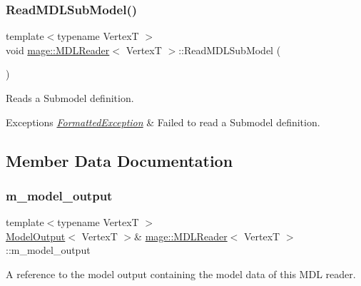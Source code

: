 \subsubsection{\texorpdfstring{Read\+M\+D\+L\+Sub\+Model()}{ReadMDLSubModel()}}
{\footnotesize\ttfamily template$<$typename VertexT $>$ \\
void \hyperlink{classmage_1_1_m_d_l_reader}{mage\+::\+M\+D\+L\+Reader}$<$ VertexT $>$\+::Read\+M\+D\+L\+Sub\+Model (\begin{DoxyParamCaption}{ }\end{DoxyParamCaption})\hspace{0.3cm}{\ttfamily [private]}}

Reads a Submodel definition.


\begin{DoxyExceptions}{Exceptions}
{\em \hyperlink{structmage_1_1_formatted_exception}{Formatted\+Exception}} & Failed to read a Submodel definition. \\
\hline
\end{DoxyExceptions}


\subsection{Member Data Documentation}
\hypertarget{classmage_1_1_m_d_l_reader_a41392308792749b78657497b69add850}{}\label{classmage_1_1_m_d_l_reader_a41392308792749b78657497b69add850} 
\subsubsection{\texorpdfstring{m\+\_\+model\+\_\+output}{m\_model\_output}}
{\footnotesize\ttfamily template$<$typename VertexT $>$ \\
\hyperlink{structmage_1_1_model_output}{Model\+Output}$<$ VertexT $>$\& \hyperlink{classmage_1_1_m_d_l_reader}{mage\+::\+M\+D\+L\+Reader}$<$ VertexT $>$\+::m\+\_\+model\+\_\+output\hspace{0.3cm}{\ttfamily [private]}}

A reference to the model output containing the model data of this M\+DL reader. 